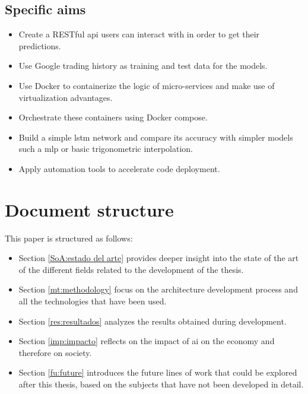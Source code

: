 \subsection{Specific aims}
\begin{itemize}
    \item Create a \gls{RESTful} \gls{api} users can interact with in order to get their predictions.
    \item Use Google trading history as training and test data for the models.
    \item Use \gls{Docker} to containerize the logic of micro-services and make use of virtualization advantages.
    \item Orchestrate these containers using \gls{Docker} compose.
    \item Build a simple \gls{lstm} network and compare its accuracy with simpler models such a \gls{mlp} or basic trigonometric interpolation.
    \item Apply automation tools to accelerate code deployment.
\end{itemize}

\section{Document structure}

This paper is structured as follows:

\begin{itemize}
    \item Section \ref{SoA:estado del arte} provides deeper insight into the state of the art of the different fields related to the development of the thesis.
    \item Section \ref{mt:methodology} focus on the architecture development process and all the technologies that have been used.
    \item Section \ref{res:resultados} analyzes the results obtained during development.
    \item Section \ref{imp:impacto} reflects on the impact of \gls{ai} on the economy and therefore on society.
    \item Section \ref{fu:future} introduces the future lines of work that could be explored after this thesis, based on the subjects that have not been developed in detail.
\end{itemize}